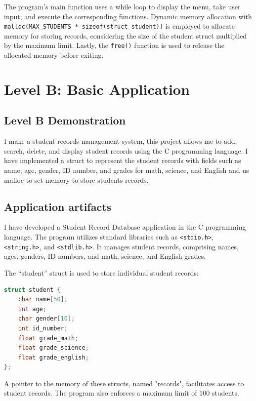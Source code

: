 \documentclass[a4paper, 11pt]{report}
\begin{document}
The program's main function uses a while loop to display the menu, take user input, and execute the corresponding functions. Dynamic memory allocation with \texttt{malloc(MAX\_STUDENTS * sizeof(struct student))} is employed to allocate memory for storing records, considering the size of the student struct multiplied by the maximum limit. Lastly, the \texttt{free()} function is used to release the allocated memory before exiting.




\newpage
\section{Level B: Basic Application}


\subsection{Level B Demonstration}

I make a student records management system, this project allows me to add, search, delete, and display student records using the C programming language. I have implemented a struct to represent the student records with fields such as name, age, gender, ID number, and grades for math, science, and English and us malloc to set memory to store students records.


\subsection{Application artifacts}

I have developed a Student Record Database application in the C programming language. The program utilizes standard libraries such as \texttt{<stdio.h>}, \texttt{<string.h>}, and \texttt{<stdlib.h>}. It manages student records, comprising names, ages, genders, ID numbers, and math, science, and English grades.

The ``student'' struct is used to store individual student records:

\begin{lstlisting}[language=C]
struct student {
    char name[50];
    int age;
    char gender[10];
    int id_number;
    float grade_math;
    float grade_science;
    float grade_english;
};
\end{lstlisting}

A pointer to the memory of these structs, named "records", facilitates access to student records. The program also enforces a maximum limit of 100 students.
\end{document}
